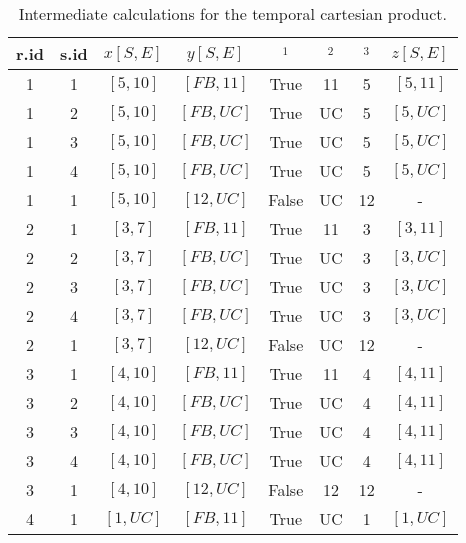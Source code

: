 \begin{table}
\begin{center}
\caption{Intermediate calculations for the temporal cartesian product.}
\vspace{2mm}
\begin{tabular}{c c c c c c c c}
\hline
r.id & s.id & $x\left[S, E\right]$ & $y\left[S, E\right]$ & $^1$ & $^2$ & $^3$  &$z\left[S, E \right]$  \\ \hline
1 & 1 & $\left[5, 10 \right]$  & $\left[FB, 11 \right]$  & True  & 11 &  5 & $\left[5, 11 \right]$ \\
1 & 2 & $\left[5, 10 \right]$  & $\left[FB, UC \right]$  & True  & UC &  5 & $\left[5, UC \right]$ \\
1 & 3 & $\left[5, 10 \right]$  & $\left[FB, UC \right]$  & True  & UC &  5 & $\left[5, UC \right]$ \\
1 & 4 & $\left[5, 10 \right]$  & $\left[FB, UC \right]$  & True  & UC &  5 & $\left[5, UC \right]$ \\
1 & 1 & $\left[5, 10 \right]$  & $\left[12, UC \right]$  & False & UC & 12 & -                     \\
2 & 1 & $\left[3, 7 \right]$   & $\left[FB, 11 \right]$  & True  & 11 &  3 & $\left[3, 11 \right]$ \\
2 & 2 & $\left[3, 7 \right]$   & $\left[FB, UC \right]$  & True  & UC &  3 & $\left[3, UC \right]$ \\
2 & 3 & $\left[3, 7 \right]$   & $\left[FB, UC \right]$  & True  & UC &  3 & $\left[3, UC \right]$ \\
2 & 4 & $\left[3, 7 \right]$   & $\left[FB, UC \right]$  & True  & UC &  3 & $\left[3, UC \right]$ \\
2 & 1 & $\left[3, 7 \right]$   & $\left[12, UC \right]$  & False & UC & 12 &  -                    \\
3 & 1 & $\left[4, 10 \right]$  & $\left[FB, 11 \right]$  & True  & 11 &  4 & $\left[4, 11 \right]$ \\
3 & 2 & $\left[4, 10 \right]$  & $\left[FB, UC \right]$  & True  & UC &  4 & $\left[4, 11 \right]$ \\
3 & 3 &  $\left[4, 10 \right]$ & $\left[FB, UC \right]$  & True  & UC &  4 & $\left[4, 11 \right]$ \\
3 & 4 & $\left[4, 10 \right]$  & $\left[FB, UC \right]$  & True  & UC &  4 & $\left[4, 11 \right]$ \\
3 & 1 & $\left[4, 10 \right]$  & $\left[12, UC \right]$  & False & 12 & 12 & -                     \\
4 & 1 & $\left[1, UC \right]$   & $\left[FB, 11 \right]$ & True  & UC &  1 & $\left[1, UC \right]$ \\

\end{tabular}
\end{center}
\end{table}
